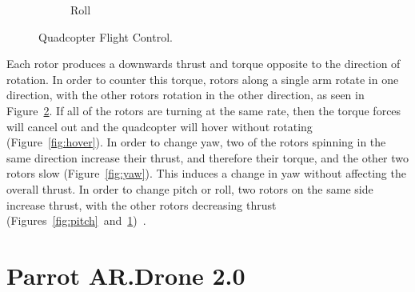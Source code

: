 \begin{figure}[ht]
\begin{subfigure}[b]{0.4\textwidth}
                        \caption{Roll}
                        \label{fig:roll}
                \end{subfigure}
                \caption{Quadcopter Flight Control.}\label{fig:flightbasics}
        \end{figure}

        Each rotor produces a downwards thrust and torque opposite to the direction of rotation. In order to counter this torque, rotors along a single arm rotate in one direction, with the other rotors rotation in the other direction, as seen in Figure~\ref{fig:flightbasics}. If all of the rotors are turning at the same rate, then the torque forces will cancel out and the quadcopter will hover without rotating (Figure~\ref{fig:hover}). In order to change yaw, two of the rotors spinning in the same direction increase their thrust, and therefore their torque, and the other two rotors slow (Figure~\ref{fig:yaw}). This induces a change in yaw without affecting the overall thrust. In order to change pitch or roll, two rotors on the same side increase thrust, with the other rotors decreasing thrust (Figures~\ref{fig:pitch}~and~\ref{fig:roll})~\cite{Dijkshoorn}.

\section{Parrot AR.Drone 2.0}

